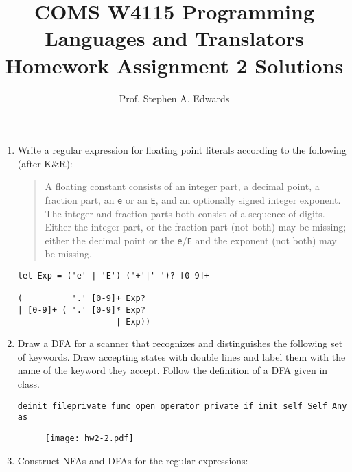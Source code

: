 \documentclass[twocolumn]{article}
\title{COMS W4115 Programming Languages and Translators \\
Homework Assignment 2 Solutions}
\author{Prof. Stephen A. Edwards}
\date{}
\begin{document}
\maketitle
\thispagestyle{empty}

\raggedright


\begin{enumerate}


\item Write a regular expression for floating point literals according
  to the following (after K\&R):

\begin{quote}
A floating constant consists of an integer part, a decimal point, a
fraction part, an \texttt{e} or an \texttt{E}, and an optionally
signed integer exponent. The integer and fraction parts both consist
of a sequence of digits. Either the integer part, or the fraction part
(not both) may be missing; either the decimal point or the
\texttt{e}/\texttt{E} and the exponent (not both) may be missing.
\end{quote}

\begin{verbatim}
let Exp = ('e' | 'E') ('+'|'-')? [0-9]+
 
(          '.' [0-9]+ Exp?
| [0-9]+ ( '.' [0-9]* Exp?
                    | Exp))
\end{verbatim}

\item Draw a DFA for a scanner that recognizes and distinguishes the
  following set of keywords.  Draw accepting states with double lines
  and label them with the name of the keyword they accept.  Follow the
  definition of a DFA given in class.

\noindent
\texttt{deinit fileprivate func open operator private if init self Self Any as}

\begin{figure}[t]
  \centerline{\texttt{[image: hw2-2.pdf]}}
\end{figure}




\item Construct NFAs and DFAs for the regular expressions:

\def\n#1{\node (#1) {#1};}
\def\nn#1{\node [double] (#1) {#1};}
\def\arc#1#2#3{\draw [->] (#1) edge node {$#3$} (#2);}
\def\arcl#1#2#3{\draw [->] (#1) edge node [left] {$#3$} (#2);}
\def\arcb#1#2#3{\draw [->] (#1) edge [bend left=10] node {$#3$} (#2);}


\end{enumerate}
\end{document}
